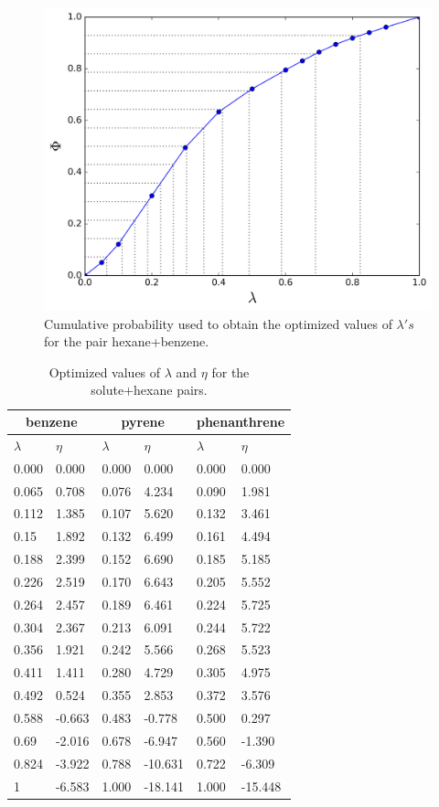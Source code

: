\begin{figure}[h]
\centering
\includegraphics[width=0.9\linewidth]{Figures/optimized_cdf}
\caption{Cumulative probability used to obtain the optimized values of $\lambda 's$ for the pair hexane+benzene.}
\label{fig:optimized_cdf}
\end{figure}
\begin{table}[h]
	\centering
	\caption{Optimized values of $\lambda $ and $\eta $ for the solute+hexane pairs.}
	\label{tbl:lambdahex}
	\begin{tabular}{llllll}
		\hline\hline
		\multicolumn{2}{c}{benzene}&\multicolumn{2}{c}{pyrene}& \multicolumn{2}{c}{phenanthrene}\\
		\hline\hline
		$\lambda$ & $\eta$& $\lambda$ & $\eta$  & $\lambda$ & $\eta$   \\ 
		\hline\hline
		0.000     &0.000      & 0.000	&	0.000	&	0.000	&	0.000	\\
		0.065     &0.708  & 0.076	&	4.234	&	0.090	&	1.981	\\
		0.112     &1.385  & 0.107	&	5.620	&	0.132	&	3.461	\\
		0.15      &1.892  & 0.132	&	6.499	&	0.161	&	4.494	\\
		0.188     &2.399  & 0.152	&	6.690	&	0.185	&	5.185	\\
		0.226     &2.519  & 0.170	&	6.643	&	0.205	&	5.552	\\
		0.264     &2.457  & 0.189	&	6.461	&	0.224	&	5.725	\\
		0.304     &2.367  & 0.213	&	6.091	&	0.244	&	5.722	\\
		0.356     &1.921  & 0.242	&	5.566	&	0.268	&	5.523	\\
		0.411     &1.411  & 0.280	&	4.729	&	0.305	&	4.975	\\
		0.492     &0.524  & 0.355	&	2.853	&	0.372	&	3.576	\\
		0.588     &-0.663 & 0.483	&	-0.778	&	0.500	&	0.297	\\
		0.69      &-2.016 & 0.678	&	-6.947	&	0.560	&	-1.390	\\
		0.824     &-3.922 & 0.788	&	-10.631	&	0.722	&	-6.309	\\
		1         &-6.583  &1.000	  &	-18.141	&	1.000	&	-15.448	\\
		\hline\hline   
	\end{tabular}
\end{table}

